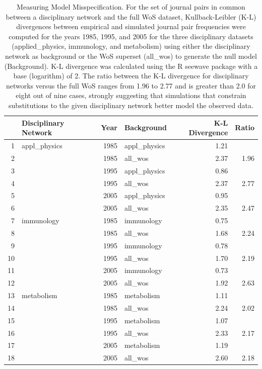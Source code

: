 \documentclass[NETN]{stjour}
\begin{document}
\begin{table}[ht]
\caption{Measuring Model Misspecification. For the set of journal pairs in common between a disciplinary network and the full WoS dataset, Kullback-Leibler (K-L) divergences
between empirical and simulated journal pair frequencies were computed for the years 1985, 1995, and 2005 for the three disciplinary datasets (applied\_physics, immunology, and metabolism) using either the disciplinary network as background or the WoS superset (all\_wos) to generate the null model (Background). K-L divergence was calculated using the R seewave package with a base (logarithm) of 2. The ratio between the K-L divergence for disciplinary networks versus the full WoS ranges from 1.96 to 2.77 and is greater than 2.0 for eight out of nine cases, strongly suggesting that simulations that constrain substitutions to the given disciplinary network better model the observed data.}
\label{tab:kld}
\centering
\begin{tabular}{|r lrlr r|}
  \hline
 & Disciplinary Network & Year & Background & K-L Divergence & Ratio \\ 
  \hline
1 & appl\_physics & 1985 & appl\_physics & 1.21 &  \\ 
  2 &  & 1985 & all\_wos & 2.37 & 1.96 \\ 
  3 &  & 1995 & appl\_physics & 0.86 &  \\ 
  4 &  & 1995 & all\_wos & 2.37 & 2.77 \\ 
  5 &  & 2005 & appl\_physics & 0.95 &  \\ 
  6 &  & 2005 & all\_wos & 2.35 & 2.47 \\ 
    \hline
  7 & immunology & 1985 & immunology & 0.75 &  \\ 
  8 &  & 1985 & all\_wos & 1.68 & 2.24 \\ 
  9 &  & 1995 & immunology & 0.78 &  \\ 
  10 &  & 1995 & all\_wos & 1.70 & 2.19 \\ 
  11 &  & 2005 & immunology & 0.73 &  \\ 
  12 &  & 2005 & all\_wos & 1.92 & 2.63 \\ 
    \hline
  13 & metabolism & 1985 & metabolism & 1.11 &  \\ 
  14 &  & 1985 & all\_wos & 2.24 & 2.02 \\ 
  15 &  & 1995 & metabolism & 1.07 &  \\ 
  16 &  & 1995 & all\_wos & 2.33 & 2.17 \\ 
  17 &  & 2005 & metabolism & 1.19 &  \\ 
  18 &  & 2005 & all\_wos & 2.60 & 2.18 \\ 
   \hline
\end{tabular}
\end{table}
\end{document}
